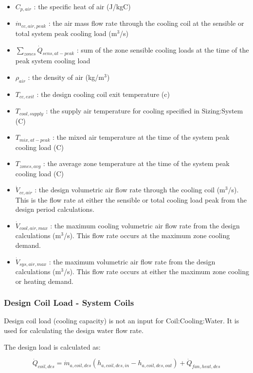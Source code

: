 \begin{itemize}
\item
  \(C_{p,air}\) : the specific heat of air (J/kgC)
\item
  \(\dot{m}_{cc,air,peak}\) : the air mass flow rate through the cooling coil at the sensible or total system peak cooling load (m\(^{3}\)/s)
\item
  \(\sum_{zones}\dot{Q}_{sens,at-peak}\) : sum of the zone sensible cooling loads at the time of the peak system cooling load
\item
  \(\rho_{air}\) : the density of air (kg/m\(^{3}\))
\item
  \(T_{cc,exit}\) : the design cooling coil exit temperature (c)
\item
  \(T_{cool,supply}\) : the supply air temperature for cooling specified in Sizing:System (C)
\item
  \(T_{mix,at-peak}\) : the mixed air temperature at the time of the system peak cooling load (C)
\item
  \(T_{zones,avg}\) : the average zone temperature at the time of the system peak cooling load (C)
\item
  \(\dot{V}_{cc,air}\) : the design volumetric air flow rate through the cooling coil (m\(^{3}\)/s). This is the flow rate at either the sensible or total cooling load peak from the design period calculations.
\item
  \(\dot{V}_{cool,air,max}\) : the maximum cooling volumetric air flow rate from the design calculations (m\(^{3}\)/s). This flow rate occurs at the maximum zone cooling demand.
\item
  \(\dot{V}_{sys,air,max}\) : the maximum volumetric air flow rate from the design calculations (m\(^{3}\)/s). This flow rate occurs at either the maximum zone cooling or heating demand.
\end{itemize}

\subsubsection{Design Coil Load - System Coils}\label{design-coil-load---system-coils}

Design coil load (cooling capacity) is not an input for Coil:Cooling:Water. It is used for calculating the design water flow rate.

The design load is calculated as:

\begin{equation}
\dot{Q}_{coil,des} = \dot{m}_{a,coil,des}\left(h_{a,coil,des,in}-h_{a,coil,des,out}\right) + \dot{Q}_{fan,heat,des}
\end{equation}

